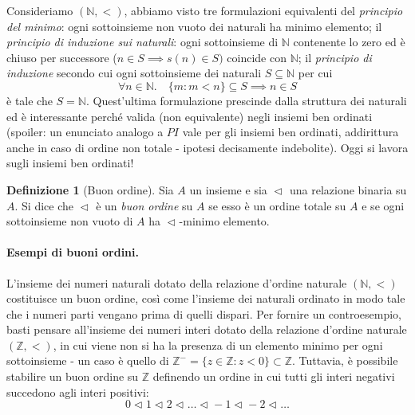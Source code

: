 \documentclass[fontsize = 11 pt, paper=A4, oneside, index=totoc, hyperref]{article}
\theoremstyle{definition}
\newtheorem{dfn}{Definizione}[section]
\theoremstyle{plain}
\newcommand{\N}{\mathbb{N}}
\newcommand{\ordine}[1]{\vartriangleleft_{\mathrm{#1}}}
\begin{document}
Consideriamo \((\N, <)\), abbiamo visto tre formulazioni equivalenti del \emph{principio del minimo}: ogni sottoinsieme non vuoto dei naturali ha minimo elemento; il \emph{principio di induzione sui naturali}: ogni sottoinsieme di \(\N\) contenente lo zero ed è chiuso per successore (\(n \in S \implies s(n) \in S)\) coincide con \(\N\); il \emph{principio di induzione} secondo cui ogni sottoinsieme dei naturali \(S \subseteq \N\) per cui
\begin{equation}
  \forall n \in \N.\quad \lbrace m \colon m < n\rbrace \subseteq S \implies n \in S
\end{equation}
è tale che \(S = \N\). Quest'ultima formulazione prescinde dalla struttura dei naturali ed è interessante perché valida (non equivalente) negli insiemi ben ordinati (spoiler: un enunciato analogo a \(PI\) vale per gli insiemi ben ordinati, addirittura anche in caso di ordine non totale - ipotesi decisamente indebolite). Oggi si lavora sugli insiemi ben ordinati!

\begin{dfn}[Buon ordine]
  Sia \(A\) un insieme e sia \(\ordine{}\) una relazione binaria su \(A\). Si dice che \(\ordine{}\) è un \emph{buon ordine} su \(A\) se esso è un ordine totale su \(A\) e se ogni sottoinsieme non vuoto di \(A\) ha \(\ordine{}\)-minimo elemento.
\end{dfn}

\paragraph{Esempi di buoni ordini.} L'insieme dei numeri naturali dotato della relazione d'ordine naturale \((\N, <)\) costituisce un buon ordine, così come l'insieme dei naturali ordinato in modo tale che i numeri parti vengano prima di quelli dispari. Per fornire un controesempio, basti pensare all'insieme dei numeri interi dotato della relazione d'ordine naturale \((\mathbb{Z}, <)\), in cui viene non si ha la presenza di un elemento minimo per ogni sottoinsieme - un caso è quello di \(\mathbb{Z}^- = \lbrace z \in \mathbb{Z} \colon z < 0 \rbrace \subset \mathbb{Z}\). Tuttavia, è possibile stabilire un buon ordine su \(\mathbb{Z}\) definendo un ordine in cui tutti gli interi negativi succedono agli interi positivi:
\[
0 \ordine{} 1 \ordine{} 2 \ordine{} \dots \ordine{} -1 \ordine{} -2 \ordine{} \dots
\]
\end{document}
